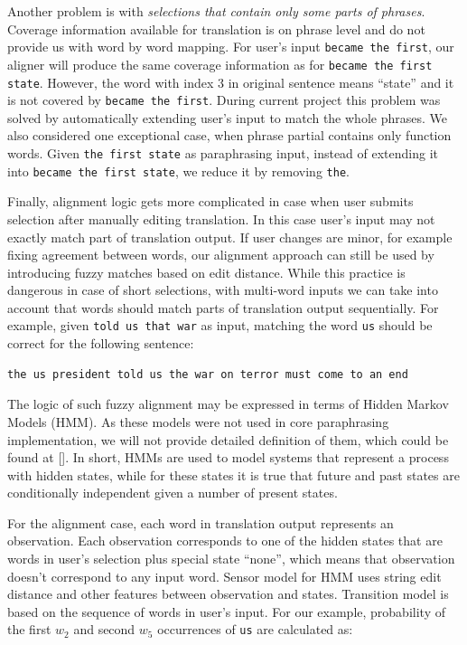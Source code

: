 Another problem is with \emph{selections that contain only some parts of phrases}. Coverage information available for translation is on phrase level and do not provide us with word by word mapping. For user's input \texttt{became the first}, our aligner will produce the same coverage information as for \texttt{became the first state}. However, the word with index 3 in original sentence means ``state'' and it is not covered by \texttt{became the first}. During current project this problem was solved by automatically extending user's input to match the whole phrases. We also considered one exceptional case, when phrase partial contains only function words. Given \texttt{the first state} as paraphrasing input, instead of extending it into \texttt{became the first state}, we reduce it by removing \texttt{the}.

Finally, alignment logic gets more complicated in case when user submits selection after manually editing translation. In this case user's input may not exactly match part of translation output. If user changes are minor, for example fixing agreement between words, our alignment approach can still be used by introducing fuzzy matches based on edit distance. While this practice is dangerous in case of short selections, with multi-word inputs we can take into account that words should match parts of translation output sequentially. For example, given \texttt{told us that war} as input, matching the word \texttt{us} should be correct for the following sentence: 

\begin{verbatim}
the us president told us the war on terror must come to an end
\end{verbatim}

The logic of such fuzzy alignment may be expressed in terms of Hidden Markov Models (HMM). As these models were not used in core paraphrasing implementation, we will not provide detailed definition of them, which could be found at []. In short, HMMs are used to model systems that represent a process with hidden states, while for these states it is true that future and past states are conditionally independent given a number of present states.

For the alignment case, each word in translation output represents an observation. Each observation corresponds to one of the hidden states that are words in user's selection plus special state ``none'', which means that observation doesn't correspond to any input word. Sensor model for HMM uses string edit distance and other features between observation and states. Transition model is based on the sequence of words in user's input. For our example, probability of the first $w_{2}$ and second $w_{5}$ occurrences of \texttt{us} are calculated as: 

